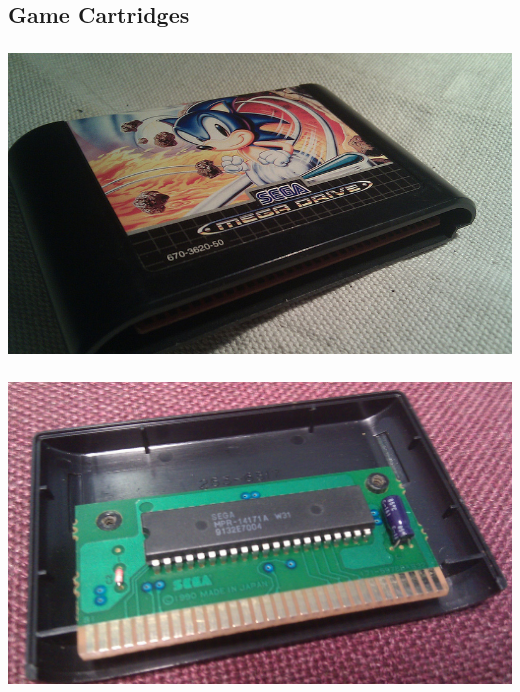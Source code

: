 \documentclass{beamer}
\begin{document}

\subsection{Game Cartridges}

\begin{frame}[fragile]
\frametitle{\insertsubsection}

\begin{center}
\includegraphics[height=0.7\textheight]{img/cart.jpg}
\end{center}

\end{frame}


\begin{frame}[fragile]
\frametitle{\insertsubsection}

\begin{center}
\includegraphics[height=0.7\textheight]{img/inside_cart.jpg}
\end{center}

\end{frame}
\end{document}
